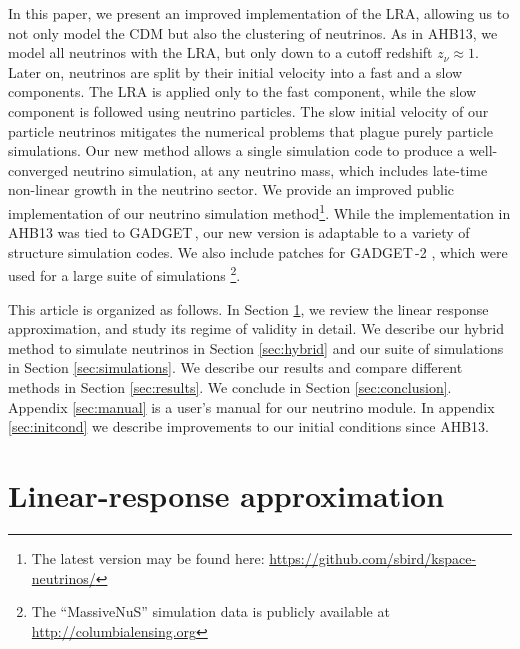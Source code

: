 \documentclass[useAMS, usenatbib]{mnras}
\newcommand{\gadget}{{\small GADGET\,}}
\begin{document}
In this paper, we present an improved implementation of the LRA, allowing us to not only model the CDM but also the clustering of neutrinos.
As in AHB13, we model all neutrinos with the LRA, but only down to a cutoff redshift $z_\nu \approx 1$. Later on, neutrinos are split by their initial velocity into a fast and a slow components. The LRA is applied only to the fast component, while the slow component is followed using neutrino particles. The slow initial velocity of our particle neutrinos mitigates the numerical problems that plague purely particle simulations. Our new method allows a single simulation code to produce a well-converged neutrino simulation, at any neutrino mass, which includes late-time non-linear growth in the neutrino sector.
We provide an improved public implementation of our neutrino simulation
method\footnote{The latest version may be found here: \url{https://github.com/sbird/kspace-neutrinos/}}.
While the implementation in AHB13 was tied to \gadget \citep{Springel_2005}, our new version is adaptable to a variety of structure simulation codes. We also include patches for \gadget-2 \citep{Springel_2005}, which were used for a large suite of simulations \cite[``MassiveNuS'': ][]{Liu_2017}\footnote{The ``MassiveNuS'' simulation data is publicly available at \url{http://columbialensing.org}}.

This article is organized as follows. In Section \ref{sec:lin_resp}, we review the linear response approximation, and study its regime of validity in detail. We describe our hybrid method to simulate neutrinos in Section \ref{sec:hybrid} and our suite of simulations in Section \ref{sec:simulations}. We describe our results and compare different methods in Section \ref{sec:results}. We conclude in Section \ref{sec:conclusion}. Appendix \ref{sec:manual} is a user's manual for our neutrino module. In appendix \ref{sec:initcond} we describe improvements to our initial conditions since AHB13.


\section{Linear-response approximation} \label{sec:lin_resp}
\end{document}
